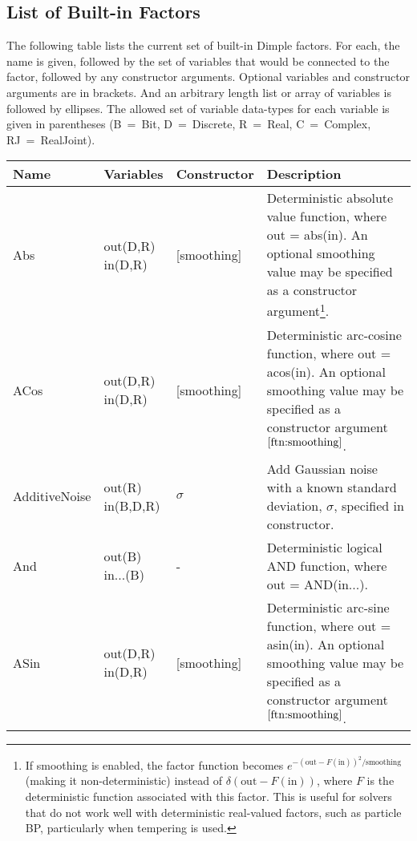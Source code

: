 \subsection{List of Built-in Factors}
\label{sec:builtInFactors}

The following table lists the current set of built-in Dimple factors.  For each, the name is given, followed by the set of variables that would be connected to the factor, followed by any constructor arguments.  Optional variables and constructor arguments are in brackets.  And an arbitrary length list or array of variables is followed by ellipses.  The allowed set of variable data-types for each variable is given in parentheses (B~=~Bit, D~=~Discrete, R~=~Real, C~=~Complex, RJ~=~RealJoint).

\begin{longtable} {p{3.5cm} p{2.2cm} p{2cm} p{7cm}}
Name & Variables & Constructor & Description \\
\hline
\endhead
%
Abs & out(D,R) \newline in(D,R) & [smoothing] & Deterministic absolute value function, where out = abs(in).  An optional smoothing value may be specified as a constructor argument\footnote{\label{ftn:smoothing}If smoothing is enabled, the factor function becomes $e^{-(\textrm{out} - F(\textrm{in}))^2/\textrm{smoothing}}$ (making it non-deterministic) instead of $\delta(\textrm{out} - F(\textrm{in}))$, where $F$ is the deterministic function associated with this factor.  This is useful for solvers that do not work well with deterministic real-valued factors, such as particle BP, particularly when tempering is used.}.\\
%
ACos & out(D,R) \newline in(D,R) & [smoothing] & Deterministic arc-cosine function, where out = acos(in). An optional smoothing value may be specified as a constructor argument$^{\ref{ftn:smoothing}}$. \\
%
AdditiveNoise & out(R) \newline in(B,D,R) & $\sigma$ & Add Gaussian noise with a known standard deviation, $\sigma$, specified in constructor. \\
%
And & out(B) \newline in...(B) & - & Deterministic logical AND function, where out = AND(in...). \\
%
ASin & out(D,R) \newline in(D,R) & [smoothing] & Deterministic arc-sine function, where out = asin(in). An optional smoothing value may be specified as a constructor argument$^{\ref{ftn:smoothing}}$. \\

\end{longtable}
